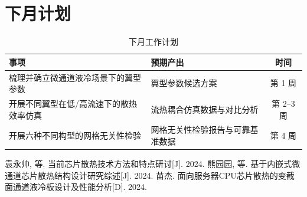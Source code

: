 \documentclass[stage1]{ydzjreport}
\begin{document}
\section{下月计划}

\begin{table}[htbp]
\centering
\caption{下月工作计划}
\begin{tabularx}{\textwidth}{@{}Y Y c@{}}
\toprule
{} 事项 & 预期产出 & 时间 \\
\midrule
梳理并确立微通道液冷场景下的翼型参数 & 翼型参数候选方案 & 第 1 周 \\
开展不同翼型在低/高流速下的散热效率仿真 & 流热耦合仿真数据与对比分析 & 第 2--3 周 \\
开展六种不同构型的网格无关性检验 & 网格无关性检验报告与可靠基准数据 & 第 4 周 \\
\bottomrule
\end{tabularx}
\end{table}


\begin{thebibliography}{9}
 袁永帅, 等. 当前芯片散热技术方法和特点研讨[J]. 2024.
 熊园园, 等. 基于内嵌式微通道芯片散热结构设计研究综述[J]. 2024.
 苗杰. 面向服务器CPU芯片散热的变截面通道液冷板设计及性能分析[D]. 2024.
\end{thebibliography}
\end{document}
